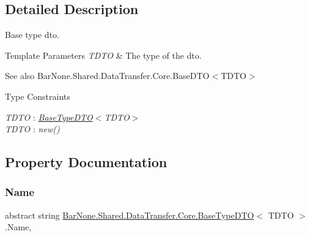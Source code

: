 \subsection{Detailed Description}
Base type dto. 


\begin{DoxyTemplParams}{Template Parameters}
{\em T\+D\+TO} & The type of the dto.\\
\hline
\end{DoxyTemplParams}
\begin{DoxySeeAlso}{See also}
Bar\+None.\+Shared.\+Data\+Transfer.\+Core.\+Base\+D\+T\+O$<$\+T\+D\+T\+O$>$


\end{DoxySeeAlso}
\begin{Desc}
\item[Type Constraints]\begin{description}
\item[{\em T\+D\+TO} : {\em \mbox{\hyperlink{class_bar_none_1_1_shared_1_1_data_transfer_1_1_core_1_1_base_type_d_t_o}{Base\+Type\+D\+TO}}$<$T\+D\+TO$>$}]\item[{\em T\+D\+TO} : {\em new()}]\end{description}
\end{Desc}


\subsection{Property Documentation}
\mbox{\label{class_bar_none_1_1_shared_1_1_data_transfer_1_1_core_1_1_base_type_d_t_o_a0c9e21182df4230205fecb54043ba1e4}} 
\subsubsection{\texorpdfstring{Name}{Name}}
{\footnotesize\ttfamily abstract string \mbox{\hyperlink{class_bar_none_1_1_shared_1_1_data_transfer_1_1_core_1_1_base_type_d_t_o}{Bar\+None.\+Shared.\+Data\+Transfer.\+Core.\+Base\+Type\+D\+TO}}$<$ T\+D\+TO $>$.Name\hspace{0.3cm}{\ttfamily [get]}, {\ttfamily [set]}}



